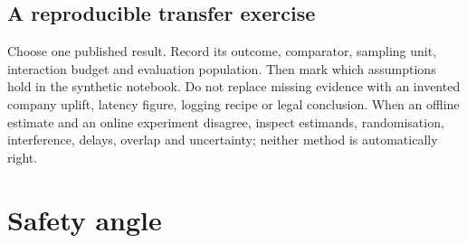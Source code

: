 \documentclass[11pt,oneside]{scrbook}
\begin{document}
\section{A reproducible transfer exercise}
Choose one published result. Record its outcome, comparator, sampling unit,
interaction budget and evaluation population. Then mark which assumptions
hold in the synthetic notebook. Do not replace missing evidence with an
invented company uplift, latency figure, logging recipe or legal conclusion.
When an offline estimate and an online experiment disagree, inspect estimands,
randomisation, interference, delays, overlap and uncertainty; neither method
is automatically right.


\chapter{Safety angle}
\end{document}
